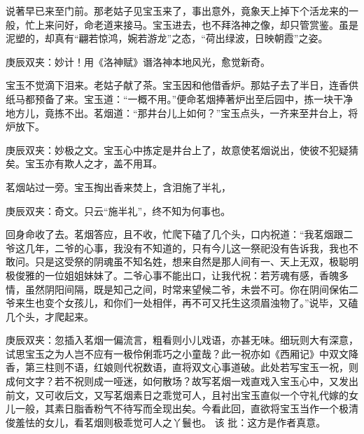 \begin{parag}
    说著早已来至门前。那老姑子见宝玉来了，事出意外，竟象天上掉下个活龙来的一般，忙上来问好，命老道来接马。宝玉进去，也不拜洛神之像，却只管赏鉴。虽是泥塑的，却真有“翩若惊鸿，婉若游龙”之态，“荷出绿波，日映朝霞”之姿。\begin{note}庚辰双夹：妙计！用《洛神赋》谮洛神本地风光，愈觉新奇。\end{note}宝玉不觉滴下泪来。老姑子献了茶。宝玉因和他借香炉。那姑子去了半日，连香供纸马都预备了来。宝玉道：“一概不用。”便命茗烟捧著炉出至后园中，拣一块干净地方儿，竟拣不出。茗烟道：“那井台儿上如何？”宝玉点头，一齐来至井台上，将炉放下。\begin{note}庚辰双夹：妙极之文。宝玉心中拣定是井台上了，故意使茗烟说出，使彼不犯疑猜矣。宝玉亦有欺人之才，盖不用耳。\end{note}
\end{parag}


\begin{parag}
    茗烟站过一旁。宝玉掏出香来焚上，含泪施了半礼，\begin{note}庚辰双夹：奇文。只云“施半礼”，终不知为何事也。\end{note}回身命收了去。茗烟答应，且不收，忙爬下磕了几个头，口内祝道：“我茗烟跟二爷这几年，二爷的心事，我没有不知道的，只有今儿这一祭祀没有告诉我，我也不敢问。只是这受祭的阴魂虽不知名姓，想来自然是那人间有一、天上无双，极聪明极俊雅的一位姐姐妹妹了。二爷心事不能出口，让我代祝：若芳魂有感，香魄多情，虽然阴阳间隔，既是知己之间，时常来望候二爷，未尝不可。你在阴间保佑二爷来生也变个女孩儿，和你们一处相伴，再不可又托生这须眉浊物了。”说毕，又磕几个头，才爬起来。\begin{note}庚辰双夹：忽插入茗烟一偏流言，粗看则小儿戏语，亦甚无味。细玩则大有深意，试思宝玉之为人岂不应有一极伶俐乖巧之小童哉？此一祝亦如《西厢记》中双文降香，第三柱则不语，红娘则代祝数语，直将双文心事道破。此处若写宝玉一祝，则成何文字？若不祝则成一哑迷，如何散场？故写茗烟一戏直戏入宝玉心中，又发出前文，又可收后文，又写茗烟素日之乖觉可人，且衬出宝玉直似一个守礼代嫁的女儿一般，其素日脂香粉气不待写而全现出矣。今看此回，直欲将宝玉当作一个极清俊羞怯的女儿，看茗烟则极乖觉可人之丫鬟也。 该 批：这方是作者真意。\end{note}
\end{parag}


